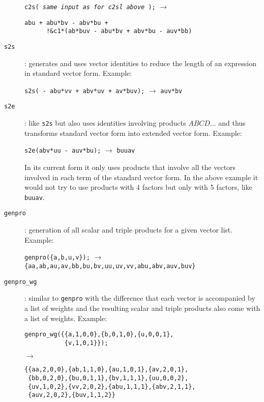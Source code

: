 \begin{description}
  \texttt{c2s( \textit{same input as for c2sl above} );}
   \quad $\longrightarrow$%
\begin{verbatim}
abu + abu*bv - abv*bu +
      !&c1*(ab*buv - abu*bv + abv*bu - auv*bb)
\end{verbatim}

\item[\texttt{s2s}] : generates and uses vector identities to reduce
  the length of an expression in standard vector form.  Example:

  \verb|s2s( - abu*vv + abv*uv + av*buv);| \quad $\longrightarrow$ \quad
  \verb|auv*bv|

\item[\texttt{s2e}] : like \texttt{s2s} but also uses identities
  involving products $\mathit{ABCD}\ldots$ and thus transforms
  standard vector form into extended vector form.  Example:

  \verb|s2e(abv*uu - auv*bu);| \quad $\longrightarrow$ \quad \verb|buuav|

  In its current form it only uses products that involve all the
  vectors involved in each term of the standard vector form.  In the
  above example it would not try to use products with 4 factors but
  only with 5 factors, like \texttt{buuav}.

\item[\texttt{genpro}] : generation of all scalar and triple products
  for a given vector list.  Example:

  \verb|genpro({a,b,u,v});| \quad $\longrightarrow$ \\
  \verb|{aa,ab,au,av,bb,bu,bv,uu,uv,vv,abu,abv,auv,buv}|

\item[\texttt{genpro\_wg}] : similar to \texttt{genpro} with the
  difference that each vector is accompanied by a list of weights and
  the resulting scalar and triple products also come with a list of
  weights.  Example:

\begin{verbatim}
genpro_wg({{a,1,0,0},{b,0,1,0},{u,0,0,1},
           {v,1,0,1}});
\end{verbatim}%
$\longrightarrow$%
\begin{verbatim}
{{aa,2,0,0},{ab,1,1,0},{au,1,0,1},{av,2,0,1},
 {bb,0,2,0},{bu,0,1,1},{bv,1,1,1},{uu,0,0,2},
 {uv,1,0,2},{vv,2,0,2},{abu,1,1,1},{abv,2,1,1},
 {auv,2,0,2},{buv,1,1,2}}
\end{verbatim}


\end{description}
